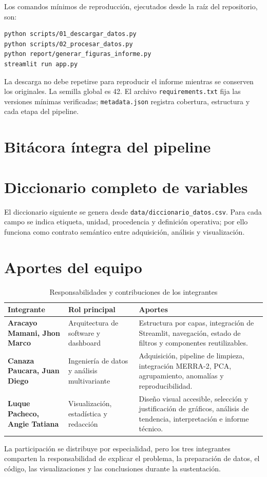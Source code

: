 \documentclass[11pt,a4paper]{article}
\begin{document}
Los comandos mínimos de reproducción, ejecutados desde la raíz del repositorio, son:

\begin{verbatim}
python scripts/01_descargar_datos.py
python scripts/02_procesar_datos.py
python report/generar_figuras_informe.py
streamlit run app.py
\end{verbatim}

La descarga no debe repetirse para reproducir el informe mientras se conserven los
originales. La semilla global es 42. El archivo \texttt{requirements.txt} fija las versiones
mínimas verificadas; \texttt{metadata.json} registra cobertura, estructura y cada etapa del
pipeline.

\section{Bitácora íntegra del pipeline}



\section{Diccionario completo de variables}

El diccionario siguiente se genera desde \texttt{data/diccionario\_datos.csv}. Para cada
campo se indica etiqueta, unidad, procedencia y definición operativa; por ello funciona
como contrato semántico entre adquisición, análisis y visualización.

\small

\normalsize

\section{Aportes del equipo}

\begin{table}[H]
\centering
\caption{Responsabilidades y contribuciones de los integrantes}
\label{tab:aportes}
\small
\begin{tabularx}{\textwidth}{>{\bfseries}p{4.0cm}p{3.3cm}X}
\toprule
Integrante & Rol principal & Aportes \\
\midrule
Aracayo Mamani, Jhon Marco & Arquitectura de software y dashboard & Estructura por capas, integración de Streamlit, navegación, estado de filtros y componentes reutilizables. \\
Canaza Paucara, Juan Diego & Ingeniería de datos y análisis multivariante & Adquisición, pipeline de limpieza, integración MERRA-2, PCA, agrupamiento, anomalías y reproducibilidad. \\
Luque Pacheco, Angie Tatiana & Visualización, estadística y redacción & Diseño visual accesible, selección y justificación de gráficos, análisis de tendencia, interpretación e informe técnico. \\
\bottomrule
\end{tabularx}
\end{table}

La participación se distribuye por especialidad, pero los tres integrantes comparten la
responsabilidad de explicar el problema, la preparación de datos, el código, las
visualizaciones y las conclusiones durante la sustentación.
\end{document}
